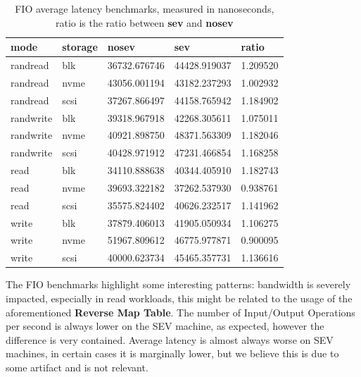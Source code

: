 \documentclass[twocolumn]{article}
\begin{document}
\begin{table}
    \small
    \begin{tabular}{lllll}
        \hline
        \textbf{mode}& \textbf{storage} & \textbf{nosev} & \textbf{sev} & \textbf{ratio} \\
        \hline
        randread     & blk              & 36732.676746   & 44428.919037 & 1.209520       \\
        randread     & nvme             & 43056.001194   & 43182.237293 & 1.002932       \\
        randread     & scsi             & 37267.866497   & 44158.765942 & 1.184902       \\
        randwrite    & blk              & 39318.967918   & 42268.305611 & 1.075011       \\
        randwrite    & nvme             & 40921.898750   & 48371.563309 & 1.182046       \\
        randwrite    & scsi             & 40428.971912   & 47231.466854 & 1.168258       \\
        read         & blk              & 34110.888638   & 40344.405910 & 1.182743       \\
        read         & nvme             & 39693.322182   & 37262.537930 & 0.938761       \\
        read         & scsi             & 35575.824402   & 40626.232517 & 1.141962       \\
        write        & blk              & 37879.406013   & 41905.050934 & 1.106275       \\
        write        & nvme             & 51967.809612   & 46775.977871 & 0.900095       \\
        write        & scsi             & 40000.623734   & 45465.357731 & 1.136616       \\
        \hline
    \end{tabular}
    \caption{FIO average latency benchmarks, measured in nanoseconds, ratio is the ratio between \textbf{sev} and \textbf{nosev}}
    \label{tab:fio-al-ratios}
\end{table}

The FIO benchmarks highlight some interesting patterns: bandwidth is severely impacted, especially in read workloads, this might be related to the usage of the aforementioned \textbf{Reverse Map Table}. The number of Input/Output Operations per second
is always lower on the SEV machine, as expected, however the difference is very contained. Average latency is almost always worse on SEV machines, in certain cases it is marginally lower, but we believe this is due to some artifact and is not relevant.
\end{document}
